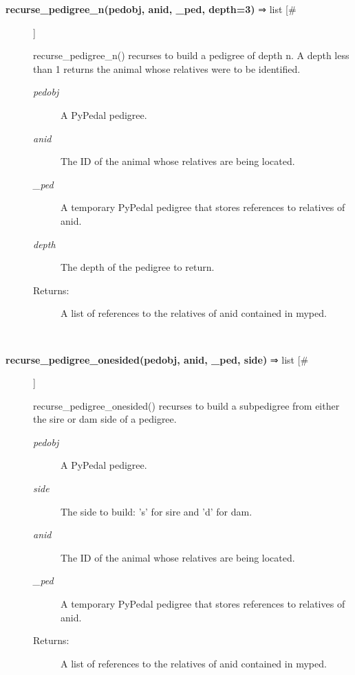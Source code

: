 \documentclass{article}
\begin{document}
\begin{description}
\item[\textbf{recurse\_pedigree\_n(pedobj, anid, \_ped, depth=3)} ⇒ list [\#]
]
\par recurse\_pedigree\_n() recurses to build a pedigree of depth n.  A depth less than 1 returns
the animal whose relatives were to be identified.
\begin{description}
\item[\textit{pedobj}
]
A PyPedal pedigree.
\item[\textit{anid}
]
The ID of the animal whose relatives are being located.
\item[\textit{\_ped}
]
A temporary PyPedal pedigree that stores references to relatives of anid.
\item[\textit{depth}
]
The depth of the pedigree to return.
\item[Returns:
]
A list of references to the relatives of anid contained in myped.
\end{description}\\

\item[\textbf{recurse\_pedigree\_onesided(pedobj, anid, \_ped, side)} ⇒ list [\#]
]
\par recurse\_pedigree\_onesided() recurses to build a subpedigree from either the sire
or dam side of a pedigree.
\begin{description}
\item[\textit{pedobj}
]
A PyPedal pedigree.
\item[\textit{side}
]
The side to build: 's' for sire and 'd' for dam.
\item[\textit{anid}
]
The ID of the animal whose relatives are being located.
\item[\textit{\_ped}
]
A temporary PyPedal pedigree that stores references to relatives of anid.
\item[Returns:
]
A list of references to the relatives of anid contained in myped.
\end{description}\\

\end{description}
\end{document}
